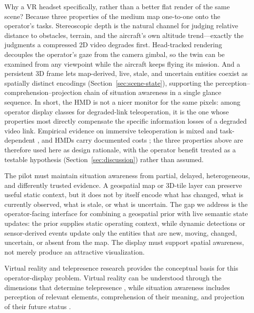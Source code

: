 \documentclass[fleqn]{VRIH2025}
\begin{document}
Why a VR headset specifically, rather than a better flat render of the same scene? Because three properties of the medium map one-to-one onto the operator's tasks. Stereoscopic depth is the natural channel for judging relative distance to obstacles, terrain, and the aircraft's own altitude trend---exactly the judgments a compressed 2D video degrades first. Head-tracked rendering decouples the operator's gaze from the camera gimbal, so the twin can be examined from any viewpoint while the aircraft keeps flying its mission. And a persistent 3D frame lets map-derived, live, stale, and uncertain entities coexist as spatially distinct encodings (Section~\ref{sec:scene-state}), supporting the perception--comprehension--projection chain of situation awareness \cite{endsley1995theory} in a single glance sequence. In short, the HMD is not a nicer monitor for the same pixels: among operator display classes for degraded-link teleoperation, it is the one whose properties most directly compensate the specific information losses of a degraded video link. Empirical evidence on immersive teleoperation is mixed and task-dependent \cite{roldan2017multirobot}, and HMDs carry documented costs \cite{fercho2026faa_svs}; the three properties above are therefore used here as design rationale, with the operator benefit treated as a testable hypothesis (Section~\ref{sec:discussion}) rather than assumed.

The pilot must maintain situation awareness from partial, delayed, heterogeneous, and differently trusted evidence. A geospatial map or 3D-tile layer can preserve useful static context, but it does not by itself encode what has changed, what is currently observed, what is stale, or what is uncertain. The gap we address is the operator-facing interface for combining a geospatial prior with live semantic state updates: the prior supplies static operating context, while dynamic detections or sensor-derived events update only the entities that are new, moving, changed, uncertain, or absent from the map. The display must support spatial awareness, not merely produce an attractive visualization.

Virtual reality and telepresence research provides the conceptual basis for this operator-display problem. Virtual reality can be understood through the dimensions that determine telepresence \cite{steuer1992vr}, while situation awareness includes perception of relevant elements, comprehension of their meaning, and projection of their future status \cite{endsley1995theory}. 
\end{document}
